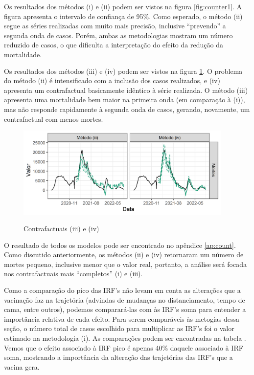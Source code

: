 \documentclass[
	12pt,				%
	oneside,			%
	a4paper,			%
	english,			%
	brazil				%
	hyperref = {colorlinks, citecolor=c1d, linkcolor=c2d, urlcolor=c3d, colorlinks}
	]{abntex2}
\newcounter{j}
\begin{document}
Os resultados dos métodos (i) e (ii) podem ser vistos na figura \ref{fig:counter1}. A figura apresenta o intervalo de confiança de 95\%. Como esperado, o método (ii) segue as séries realizadas com muito mais precisão, inclusive ``prevendo'' a segunda onda de casos. Porém, ambas as metodologias mostram um número reduzido de casos, o que dificulta a interpretação do efeito da redução da mortalidade.

Os resultados dos métodos (iii) e (iv) podem ser vistos na figura \ref{fig:counter2}. O problema do método (ii) é intensificado com a inclusão dos casos realizados, e (iv) apresenta um contrafactual basicamente idêntico à série realizada. O método (iii) apresenta uma mortalidade bem maior na primeira onda (em comparação à (i)), mas não responde rapidamente à segunda onda de casos, gerando, novamente, um contrafactual com menos mortes.

\begin{figure}[H]
    \centering
    \caption{Contrafactuais (iii) e (iv)}
    \includegraphics[width = 0.95\textwidth]{Figuras/counterfactual2.png}
    \label{fig:counter2}
\end{figure}

O resultado de todos os modelos pode ser encontrado no apêndice \ref{ap:count}. Como discutido anteriormente, os métodos (ii) e (iv) retornaram um número de mortes pequeno, inclusive menor que o valor real, portanto, a análise será focada nos contrafactuais mais ``completos'' (i) e (iii).

Como a comparação do pico das IRF's não levam em conta as alterações que a vacinação faz na trajetória (advindas de mudanças no distanciamento, tempo de cama, entre outros), podemos comparará-las com às IRF's soma para entender a importância relativa de cada efeito. Para serem comparáveis às metogias dessa seção, o número total de casos escolhido para multiplicar as IRF's foi o valor estimado na metodologia (i). As comparações podem ser encontradas na tabela \label{tb:counter1}. Vemos que o efeito associado à IRF pico é apenas 40\% daquele associado à IRF soma, mostrando a importância da alteração das trajetórias das IRF's que a vacina gera.
\end{document}
